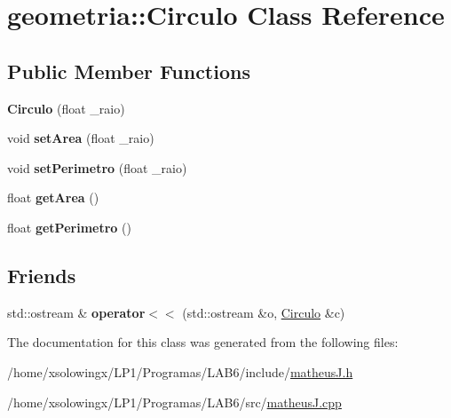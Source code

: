 \hypertarget{classgeometria_1_1Circulo}{}\section{geometria\+:\+:Circulo Class Reference}
\label{classgeometria_1_1Circulo}
\subsection*{Public Member Functions}
\begin{DoxyCompactItemize}
\item 
\mbox{\label{classgeometria_1_1Circulo_a05ba56479f6dc378f5a6d6287f69cf28}} 
{\bfseries Circulo} (float \+\_\+raio)
\item 
\mbox{\label{classgeometria_1_1Circulo_a9664713aceff8fcd4c9046cdcd25e17d}} 
void {\bfseries set\+Area} (float \+\_\+raio)
\item 
\mbox{\label{classgeometria_1_1Circulo_af3e96d1c72226810077ea5f5a6cd1f81}} 
void {\bfseries set\+Perimetro} (float \+\_\+raio)
\item 
\mbox{\label{classgeometria_1_1Circulo_a5eb2eda6f8c0a586aa08238bdc7fd5c5}} 
float {\bfseries get\+Area} ()
\item 
\mbox{\label{classgeometria_1_1Circulo_a2f8328597586f7bdd64e456b4bb5da46}} 
float {\bfseries get\+Perimetro} ()
\end{DoxyCompactItemize}
\subsection*{Friends}
\begin{DoxyCompactItemize}
\item 
\mbox{\label{classgeometria_1_1Circulo_a89c7b12bef23dfb98a017339591ae712}} 
std\+::ostream \& {\bfseries operator$<$$<$} (std\+::ostream \&o, \hyperlink{classgeometria_1_1Circulo}{Circulo} \&c)
\end{DoxyCompactItemize}


The documentation for this class was generated from the following files\+:\begin{DoxyCompactItemize}
\item 
/home/xsolowingx/\+L\+P1/\+Programas/\+L\+A\+B6/include/\hyperlink{matheusJ_8h}{matheus\+J.\+h}\item 
/home/xsolowingx/\+L\+P1/\+Programas/\+L\+A\+B6/src/\hyperlink{matheusJ_8cpp}{matheus\+J.\+cpp}\end{DoxyCompactItemize}
